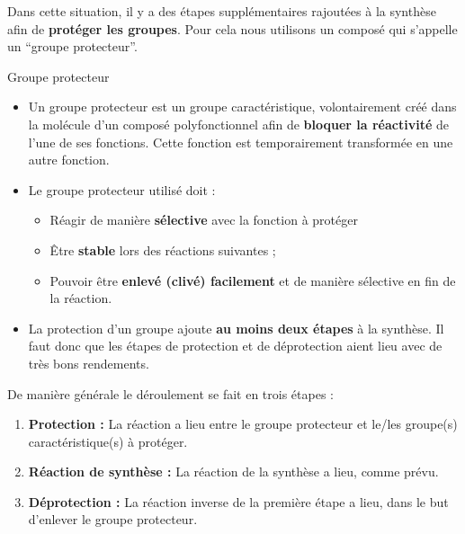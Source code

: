 \documentclass[11pt,a4paper]{article}
\begin{document}
Dans cette situation, il y a des étapes supplémentaires rajoutées à la synthèse afin de \textbf{protéger les groupes}. Pour cela nous utilisons un composé qui s'appelle un ``groupe protecteur''. 

\begin{defn}{Groupe protecteur}
\begin{itemize}
    \item Un groupe protecteur est un groupe caractéristique, volontairement créé dans la molécule d’un composé polyfonctionnel afin de \textbf{bloquer la réactivité} de l’une de ses fonctions. Cette fonction est temporairement transformée en une autre fonction. 
    \item Le groupe protecteur utilisé doit :
    \begin{itemize}
        \item Réagir de manière \textbf{sélective} avec la fonction à protéger
        \item Être \textbf{stable} lors des réactions suivantes ;
        \item Pouvoir être \textbf{enlevé (clivé) facilement} et de manière sélective en fin de la réaction. 
    \end{itemize}
    \item La protection d’un groupe ajoute \textbf{au moins deux étapes} à la synthèse. Il faut donc que les étapes de protection et de déprotection aient lieu avec de très bons rendements. 
\end{itemize}
\end{defn}

De manière générale le déroulement se fait en trois étapes : 
\begin{enumerate}
    \item \textbf{Protection : }La réaction a lieu entre le groupe protecteur et le/les groupe(s) caractéristique(s) à protéger. 
    \item \textbf{Réaction de synthèse : }La réaction de la synthèse a lieu, comme prévu. 
    \item \textbf{Déprotection : }La réaction inverse de la première étape a lieu, dans le but d'enlever le groupe protecteur. 
\end{enumerate}
\end{document}
